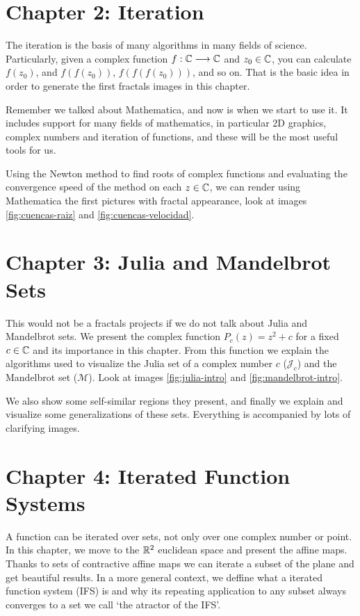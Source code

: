 \section*{Chapter 2: Iteration}

The iteration is the basis of many algorithms in many fields of science. Particularly, given a complex function $f:\mathbb{C}\longrightarrow\mathbb{C}$ and $z_0\in\mathbb{C}$, you can calculate $f(z_0)$, and $f(f(z_0))$, $f(f(f(z_0)))$, and so on. That is the basic idea in order to generate the first fractals images in this chapter.

Remember we talked about Mathematica, and now is when we start to use it. It includes support for many fields of mathematics, in particular 2D graphics, complex numbers and iteration of functions, and these will be the most useful tools for us. 

Using the Newton method to find roots of complex functions and evaluating the convergence speed of the method on each $z\in\mathbb{C}$, we can render using Mathematica the first pictures with fractal appearance, look at images \ref{fig:cuencas-raiz} and \ref{fig:cuencas-velocidad}.

\section*{Chapter 3: Julia and Mandelbrot Sets}

This would not be a fractals projects if we do not talk about Julia and Mandelbrot sets. We present the complex function $P_c(z)=z^2 +c$ for a fixed $c\in\mathbb{C}$ and its importance in this chapter. From this function we explain the algorithms used to visualize the Julia set of a complex number $c$ ($\mathcal{J}_c$) and the Mandelbrot set ($\mathcal{M}$). Look at images \ref{fig:julia-intro} and \ref{fig:mandelbrot-intro}. 

We also show some self-similar regions they present, and finally we explain and visualize some generalizations of these sets. Everything is accompanied by lots of clarifying images.

\section*{Chapter 4: Iterated Function Systems}

A function can be iterated over sets, not only over one complex number or point. In this chapter, we move to the $\mathbb{R}^2$ euclidean space and present the affine maps. Thanks to sets of contractive affine maps we can iterate a subset of the plane and get beautiful results. In a more general context, we deffine what a iterated function system (IFS) is and why its repeating application to any subset always converges to a set we call `the atractor of the IFS'.

